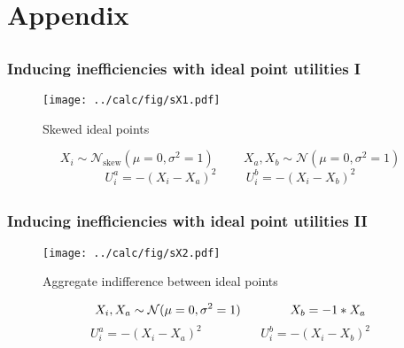 \documentclass{beamer}
\begin{document}
\section{Appendix}
\subsection{}
\begin{frame}%
  \frametitle{Inducing inefficiencies with ideal point utilities I}
  \begin{figure}[ht]\centering
    \texttt{[image: ../calc/fig/sX1.pdf]}
    \caption{Skewed ideal points}
  \end{figure}
  $$X_i \sim \mathcal{N}_\text{skew}(\mu=0,\sigma^2=1) \hspace{1cm} X_a,X_b \sim \mathcal{N}(\mu=0,\sigma^2=1)$$
  $$U^a_i = -(X_i - X_a)^2 \hspace{1cm} U^b_i = -(X_i - X_b)^2$$
\end{frame}
\subsection{}
\begin{frame}%
  \frametitle{Inducing inefficiencies with ideal point utilities II}
  \begin{figure}[ht]\centering
    \texttt{[image: ../calc/fig/sX2.pdf]}
    \caption{Aggregate indifference between ideal points}
  \end{figure}
  $$X_i,X_a \sim \mathcal{N}(\mu=0,\sigma^2=1) \hspace{1.4cm} X_b = -1*X_a $$
  $$U^a_i = -(X_i - X_a)^2 \hspace{2cm} U^b_i = -(X_i - X_b)^2$$
\end{frame}
\end{document}
